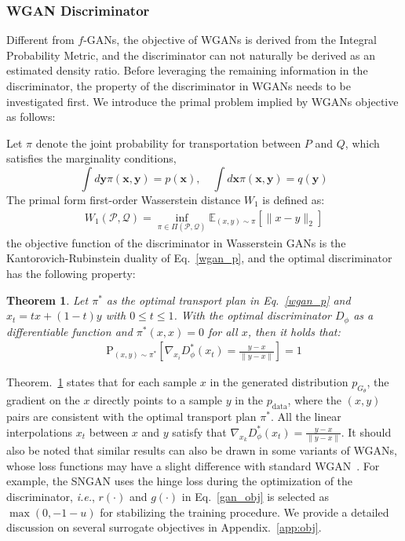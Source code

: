 \documentclass{article}
\newtheorem{theorem}{Theorem}
\begin{document}
\subsubsection{WGAN Discriminator}\label{sec::wgan-critic}
Different from $f$-GANs, the objective of WGANs is derived from the Integral Probability Metric, and the discriminator can not naturally be derived as an estimated density ratio. Before leveraging the remaining information in the discriminator, the property of the discriminator in WGANs needs to be investigated first. We introduce the primal problem implied by WGANs objective as follows:

Let $\pi$ denote the joint probability for transportation between $P$ and $Q$, which satisfies the marginality conditions,
\begin{equation}\label{wgan_p}
       \int d \boldsymbol{y} \pi(\boldsymbol{x}, \boldsymbol{y})=p(\boldsymbol{x}), \quad  \int d \boldsymbol{x} \pi(\boldsymbol{x}, \boldsymbol{y})=q(\boldsymbol{y})
\end{equation}
The primal form first-order Wasserstein distance $W_1$ is defined as:
\begin{align*}
W_{1}\left(\mathcal{P}, \mathcal{Q}\right)=\inf _{\pi \in \Pi\left(\mathcal{P}, \mathcal{Q}\right)} \mathbb{E}_{(x, y) \sim \pi}[\|x- y\|_{2}]
\end{align*}
the objective function of the discriminator in Wasserstein GANs is the Kantorovich-Rubinstein duality of  Eq.~\ref{wgan_p}, and the optimal discriminator has the following property\cite{gulrajani2017improved}:
\begin{theorem}
\label{gradient_direction}
Let $\pi^{*}$ as the optimal transport plan in Eq.~\ref{wgan_p} and $x_{t}=t x+(1-t) y$ with $0 \leq t \leq 1$. With the optimal discriminator $D_\phi$ as a differentiable function and $\pi^{*}(x,x) = 0$ for all $x$, then it holds that:
\begin{align*}
    \mathrm{P}_{(x, y) \sim \pi^{*}}\left[\nabla_{x_{i}} D_\phi^{*}\left(x_{t}\right)=\frac{y-x}{\|y-x\|}\right]=1
\end{align*}
\end{theorem}

Theorem.~\ref{gradient_direction} states that for each sample $x$ in the generated distribution $p_{G_\theta}$, the gradient on the $x$ directly points to a sample $y$ in the $p_{\text{data}}$, where the $(x,y)$ pairs are consistent with the optimal transport plan $\pi ^{*}$. All the linear interpolations $x_t$ between $x$ and $y$ satisfy that $\nabla_{x_{k}} D_\phi^{*}\left(x_{t}\right)=\frac{y-x}{\|y-x\|}$. 
It should also be noted that similar results can also be drawn in some variants of WGANs, whose loss functions may have a slight difference with standard WGAN~\cite{zhou2019lipschitz}. 
For example, the SNGAN uses the hinge loss during the optimization of the discriminator, \textit{i.e.}, $r(\cdot)$ and $g(\cdot)$ in Eq.~\ref{gan_obj} is selected as $\max (0,-1-u)$ for stabilizing the  training procedure. 
We provide a detailed discussion on several surrogate objectives in Appendix.~\ref{app:obj}.
\end{document}
